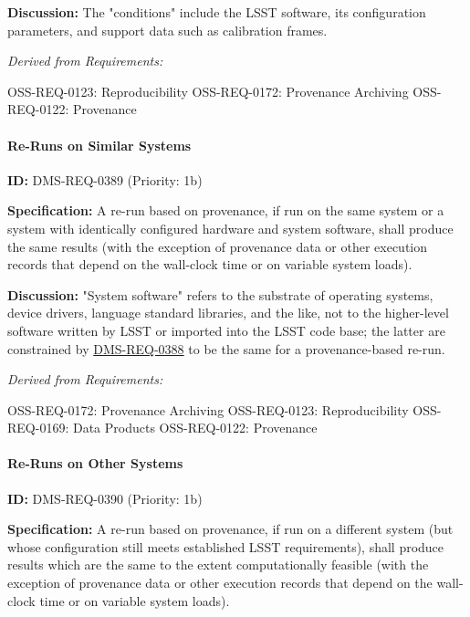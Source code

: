\documentclass[SE,toc,lsstdraft]{lsstdoc}
\begin{document}
\textbf{Discussion:}
The "conditions" include the LSST software, its configuration parameters, and support data such as calibration frames.

\emph{Derived from Requirements:}

OSS-REQ-0123:
Reproducibility \newline
OSS-REQ-0172:
Provenance Archiving \newline
OSS-REQ-0122:
Provenance \newline

\paragraph{Re-Runs on Similar Systems}\hfill  %

\label{DMS-REQ-0389}
\textbf{ID:} DMS-REQ-0389 (Priority: 1b)

\textbf{Specification:}
A re-run based on provenance, if run on the same system or a system with identically configured hardware and system software, shall produce the same results (with the exception of provenance data or other execution records that depend on the wall-clock time or on variable system loads).

\textbf{Discussion:}
"System software" refers to the substrate of operating systems, device drivers, language standard libraries, and the like, not to the higher-level software written by LSST or imported into the LSST code base; the latter are constrained by \hyperref[DMS-REQ-0388]{DMS-REQ-0388} to be the same for a provenance-based re-run.

\emph{Derived from Requirements:}

OSS-REQ-0172:
Provenance Archiving \newline
OSS-REQ-0123:
Reproducibility \newline
OSS-REQ-0169:
Data Products \newline
OSS-REQ-0122:
Provenance \newline

\paragraph{Re-Runs on Other Systems}\hfill  %

\label{DMS-REQ-0390}
\textbf{ID:} DMS-REQ-0390 (Priority: 1b)

\textbf{Specification:}
A re-run based on provenance, if run on a different system (but whose configuration still meets established LSST requirements), shall produce results which are the same to the extent computationally feasible (with the exception of provenance data or other execution records that depend on the wall-clock time or on variable system loads).
\end{document}
